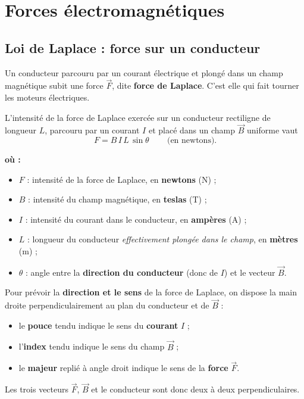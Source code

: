 \documentclass[11pt,a4paper]{article}
\newenvironment{ou}{%
  \par\smallskip\noindent\textbf{où :}\nopagebreak
  \begin{itemize}[leftmargin=1.8em,topsep=2pt,itemsep=1.5pt,parsep=0pt]}%
  {\end{itemize}}
\newcommand{\Bvec}{\vec{B}}
\newcommand{\Fvec}{\vec{F}}
\begin{document}
\section{Forces électromagnétiques}

\subsection{Loi de Laplace : force sur un conducteur}

\begin{definition}
Un conducteur parcouru par un courant électrique et plongé dans un champ magnétique subit une force
$\Fvec$, dite \textbf{force de Laplace}. C'est elle qui fait tourner les moteurs électriques.
\end{definition}

\begin{theoreme}
L'intensité de la force de Laplace exercée sur un conducteur rectiligne de longueur $L$, parcouru
par un courant $I$ et placé dans un champ $\Bvec$ uniforme vaut
\[ \boxed{\,F = B\, I\, L\, \sin\theta\,} \qquad\text{(en newtons).} \]
\begin{ou}
  \item $F$ : intensité de la force de Laplace, en \textbf{newtons} (\si{\newton}) ;
  \item $B$ : intensité du champ magnétique, en \textbf{teslas} (\si{\tesla}) ;
  \item $I$ : intensité du courant dans le conducteur, en \textbf{ampères} (\si{\ampere}) ;
  \item $L$ : longueur du conducteur \emph{effectivement plongée dans le champ}, en \textbf{mètres}
        (\si{\metre}) ;
  \item $\theta$ : angle entre la \textbf{direction du conducteur} (donc de $I$) et le vecteur $\Bvec$.
\end{ou}
\end{theoreme}

\begin{methode}
Pour prévoir la \textbf{direction et le sens} de la force de Laplace, on dispose la main droite
perpendiculairement au plan du conducteur et de $\Bvec$ :
\begin{itemize}[leftmargin=1.6em,topsep=2pt,itemsep=1pt]
  \item le \textbf{pouce} tendu indique le sens du \textbf{courant} $I$ ;
  \item l'\textbf{index} tendu indique le sens du champ $\Bvec$ ;
  \item le \textbf{majeur} replié à angle droit indique le sens de la \textbf{force} $\Fvec$.
\end{itemize}
Les trois vecteurs $\Fvec$, $\Bvec$ et le conducteur sont donc deux à deux perpendiculaires.
\end{methode}
\end{document}
